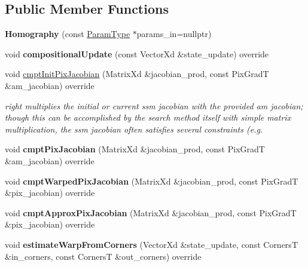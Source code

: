 \subsection*{Public Member Functions}
\begin{DoxyCompactItemize}
\item 
\hypertarget{classHomography_a760af8a2a57d5ba53db8df6b0cc0dbe5}{{\bfseries Homography} (const \hyperlink{structHomographyParams}{Param\-Type} $\ast$params\-\_\-in=nullptr)}\label{classHomography_a760af8a2a57d5ba53db8df6b0cc0dbe5}

\item 
\hypertarget{classHomography_a5193f898d646583fbe4f7d0acde85a92}{void {\bfseries compositional\-Update} (const Vector\-Xd \&state\-\_\-update) override}\label{classHomography_a5193f898d646583fbe4f7d0acde85a92}

\item 
void \hyperlink{classHomography_a2d9bf9a73b33fe6ea5537d1ab790aa0b}{cmpt\-Init\-Pix\-Jacobian} (Matrix\-Xd \&jacobian\-\_\-prod, const Pix\-Grad\-T \&am\-\_\-jacobian) override
\begin{DoxyCompactList}\small\item\em right multiplies the initial or current ssm jacobian with the provided am jacobian; though this can be accomplished by the search method itself with simple matrix multiplication, the ssm jacobian often satisfies several constraints (e.\-g. \end{DoxyCompactList}\item 
\hypertarget{classHomography_a007cee14e5bcbed442bcf46d153b4098}{void {\bfseries cmpt\-Pix\-Jacobian} (Matrix\-Xd \&jacobian\-\_\-prod, const Pix\-Grad\-T \&am\-\_\-jacobian) override}\label{classHomography_a007cee14e5bcbed442bcf46d153b4098}

\item 
\hypertarget{classHomography_aff7a96878ef9e769f305b7f6f569cfbc}{void {\bfseries cmpt\-Warped\-Pix\-Jacobian} (Matrix\-Xd \&jacobian\-\_\-prod, const Pix\-Grad\-T \&pix\-\_\-jacobian) override}\label{classHomography_aff7a96878ef9e769f305b7f6f569cfbc}

\item 
\hypertarget{classHomography_aefda4eeb0084b101028d9fd571dcc8d4}{void {\bfseries cmpt\-Approx\-Pix\-Jacobian} (Matrix\-Xd \&jacobian\-\_\-prod, const Pix\-Grad\-T \&pix\-\_\-jacobian) override}\label{classHomography_aefda4eeb0084b101028d9fd571dcc8d4}

\item 
\hypertarget{classHomography_a828bb1018d8c7a75d45c8432d7339c79}{void {\bfseries estimate\-Warp\-From\-Corners} (Vector\-Xd \&state\-\_\-update, const Corners\-T \&in\-\_\-corners, const Corners\-T \&out\-\_\-corners) override}\label{classHomography_a828bb1018d8c7a75d45c8432d7339c79}


\end{DoxyCompactItemize}
